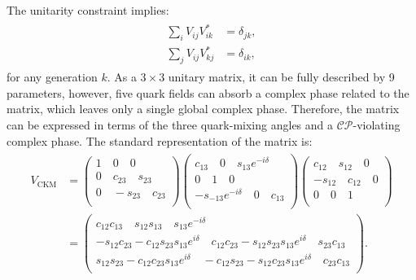 The unitarity constraint implies:
\begin{align}\label{eq:unitarity}
    \begin{split}
    \sum_i V^{}_{ij} V_{ik}^* &= \delta_{jk},\\
    \sum_j V^{}_{ij} V_{kj}^* &= \delta_{ik},
    \end{split}
\end{align}
for any generation $k$.
As a $3\times3$ unitary matrix, it can be fully described by 9 parameters, however, five quark fields can absorb a complex phase related to the matrix,
which leaves only a single global complex phase.
Therefore, the \CKM matrix can be expressed in terms of the three quark-mixing angles and a $\mathcal{CP}$-violating complex phase.
The standard representation of the \CKM matrix is:
\begin{align}
    \begin{split}
    V_{\mathrm{CKM}}&=
    \begin{pmatrix}
        1 \quad 0 \quad 0\\
        0 \quad c_{23} \quad s_{23}\\
        0 \quad -s_{23} \quad c_{23}\\
    \end{pmatrix}
    \begin{pmatrix}
        c_{13} \quad 0 \quad s_{13}e^{-i\delta}\\
        0      \quad 1 \quad 0\\
        -s_{-13}e^{-i\delta} \quad 0 \quad c_{13}\\
    \end{pmatrix}
    \begin{pmatrix}
        c_{12} \quad s_{12} \quad 0\\
        -s_{12} \quad c_{12} \quad 0\\
        0 \quad 0 \quad 1\\
    \end{pmatrix}
    \\
    &=
    \begin{pmatrix}
        c_{12}c_{13} \quad s_{12}s_{13} \quad s_{13}e^{-i\delta}\\
        -s_{12}c_{23} - c_{12}s_{23}s_{13}e^{i\delta} \quad c_{12}c_{23} - s_{12}s_{23}s_{13}e^{i\delta} \quad s_{23} c_{13}\\
        s_{12}s_{23} - c_{12}c_{23} s_{13}e^{i\delta} \quad -c_{12}s_{23} - s_{12}c_{23}s_{13}e^{i\delta} \quad c_{23}c_{13}\\
    \end{pmatrix}.
    \end{split}
\end{align}

